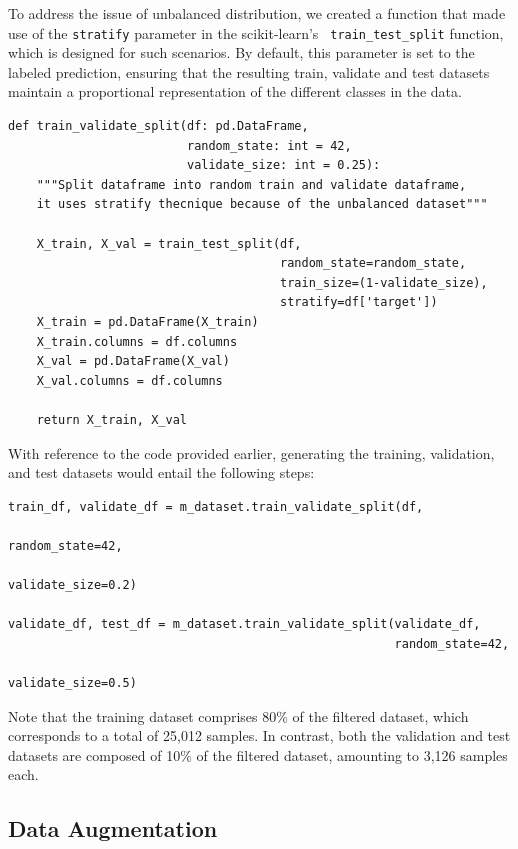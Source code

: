 To address the issue of unbalanced distribution, we created a function that
made use of the {\tt stratify} parameter in the scikit-learn's {\tt
train\_test\_split} function, which is designed for such scenarios. By default,
this parameter is set to the labeled prediction, ensuring that the resulting
train, validate and test datasets maintain a proportional representation of the
different classes in the data.

\begin{Verbatim}[fontsize=\scriptsize]
def train_validate_split(df: pd.DataFrame,
                         random_state: int = 42,
                         validate_size: int = 0.25):
    """Split dataframe into random train and validate dataframe,
    it uses stratify thecnique because of the unbalanced dataset"""

    X_train, X_val = train_test_split(df,
                                      random_state=random_state,
                                      train_size=(1-validate_size),
                                      stratify=df['target'])
    X_train = pd.DataFrame(X_train)
    X_train.columns = df.columns
    X_val = pd.DataFrame(X_val)
    X_val.columns = df.columns

    return X_train, X_val
\end{Verbatim}

With reference to the code provided earlier, generating the training,
validation, and test datasets would entail the following steps:

\begin{Verbatim}[fontsize=\scriptsize]
train_df, validate_df = m_dataset.train_validate_split(df,
                                                       random_state=42,
                                                       validate_size=0.2)

validate_df, test_df = m_dataset.train_validate_split(validate_df,
                                                      random_state=42,
                                                      validate_size=0.5)
\end{Verbatim}

Note that the training dataset comprises 80\% of the filtered dataset, which
corresponds to a total of 25,012 samples. In contrast, both the validation and
test datasets are composed of 10\% of the filtered dataset, amounting to 3,126
samples each.

\subsection{Data Augmentation}


